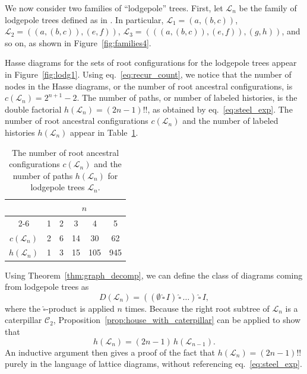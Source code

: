 \documentclass[10pt]{article}
\newcommand{\house}{\,\widehat{\square}\,}
\begin{document}
We now consider two families of ``lodgepole'' trees. First, let $\mathcal L_n$ be the family of lodgepole trees defined as in \cite{disanto2015coalescent}. In particular, $\mathcal L_1 = (a,(b,c))$, $\mathcal L_2 = ((a,(b,c)),(e,f))$, $\mathcal L_3 = (((a,(b,c)),(e,f)),(g,h))$, and so on, as shown in Figure~\ref{fig:families4}.

Hasse diagrams for the sets of root configurations for the lodgepole trees appear in Figure~\ref{fig:lodg1}. Using eq.~\ref{eq:recur_count}, we notice that the number of nodes in the Hasse diagrams, or the number of root ancestral configurations, is $c(\mathcal{L}_n)=2^{n+1} - 2$. The number of paths, or number of labeled histories, is the double factorial $h(\mathcal{L}_{n})=(2n-1)!!$, as obtained by eq.~\ref{eq:steel_exp}. The number of root ancestral configurations $c(\mathcal{L}_n)$ and the number of labeled histories $h(\mathcal{L}_{n})$ appear in  Table~\ref{tbl:lodgepole1_numbers}.

\begin{table}[tb]
\centering
	\begin{tabular}{cccccc}
		\toprule 
            & \multicolumn{5}{c}{$n$} \\ \cline{2-6}
		    & 1 & 2 & 3 & 4 & 5 \\
		\hline
		$c(\mathcal L_{n})$ & 2 & 6 & 14 & 30  & 62 \\
		$h(\mathcal L_{n})$ & 1 & 3 & 15 & 105 & 945 \\
		\bottomrule
	\end{tabular}
	\caption{The number of root ancestral configurations $c(\mathcal L_n)$ and the number of paths $h(\mathcal L_n)$ for lodgepole trees $\mathcal L_n$.}
	\label{tbl:lodgepole1_numbers}
\end{table}

Using Theorem~\ref{thm:graph_decomp}, we can define the class of diagrams coming from lodgepole trees as
\begin{equation}\label{eq:decomp_lodg1}
    D(\mathcal L_n) = ((\emptyset \house I)\house \ldots)\house I,
\end{equation}
where the $\widehat \square$-product is applied $n$ times. Because the right root subtree of $\mathcal L_n$ is a caterpillar $\mathcal C_2$, Proposition~\ref{prop:house_with_caterpillar} can be applied to show that 
\[
    h(\mathcal L_n) = (2n-1) \, h(\mathcal L_{n-1}).
\]
An inductive argument then gives a proof of the fact that $h(\mathcal{L}_{n})=(2n-1)!!$ purely in the language of lattice diagrams, without referencing eq.~\ref{eq:steel_exp}.
\end{document}
